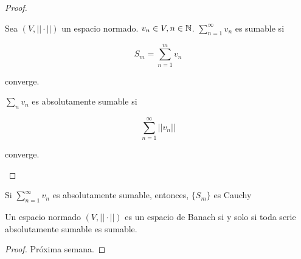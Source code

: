 \documentclass[../Apunte.tex]{subfiles}
\begin{document}
\begin{proof}
    \begin{fdefinition}
        Sea $(V,||\cdot||)$ un espacio normado. $v_n\in V,n\in\mathbb{N}$. $\displaystyle\sum_{n=1}^\infty v_n$ es \color{red} sumable \color{black} si

        \[S_m=\sum_{n=1}^m v_n\]

        converge.

        $\displaystyle\sum_{n} v_n$ es \color{red} absolutamente sumable \color{black} si 

        \[\sum_{n=1}^\infty ||v_n||\]

        converge.
    \end{fdefinition}
\end{proof}

\begin{fproposition}
    Si $\displaystyle\sum_{n=1}^\infty v_n$ es absolutamente sumable, entonces, $\{S_m\}$ es Cauchy
\end{fproposition}

\begin{ftheorem}
    Un espacio normado $(V,||\cdot||)$ es un espacio de Banach si y solo si toda serie absolutamente sumable es sumable.
\end{ftheorem}

\begin{proof}
    Próxima semana.
\end{proof}
\end{document}

